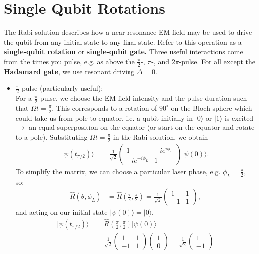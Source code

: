 \documentclass[lasers.tex]{subfiles}
\begin{document}
\section{Single Qubit Rotations}
The Rabi solution describes how a near-resonance EM field may be used to drive the qubit from any initial state to any final state. 
Refer to this operation as a \textbf{single-qubit rotation} or \textbf{single-qubit gate.}
Three useful interactions come from the times you pulse, e.g. as above the $\frac{\pi}{2}$-, $\pi$-, and $2\pi$-pulse.
For all except the \textbf{Hadamard gate}, we use resonant driving $\Delta=0$.
\begin{itemize}
    \item $\frac{\pi}{2}$-pulse (particularly useful):\\
        For a $\frac{\pi}{2}$ pulse, we choose the EM field intensity and the pulse duration such that $\Omega t=\frac{\pi}{2}$. 
        This corresponds to a rotation of $90^\circ$ on the Bloch sphere which could take us from pole to equator, i.e. a qubit initially in $|0\rangle$ or $|1\rangle$ is excited $\to$ an equal superposition on the equator (or start on the equator and rotate to a pole).
        Substituting $\Omega t=\frac{\pi}{2}$ in the Rabi solution, we obtain
        \begin{align}
            |\psi(t_{\pi/2})\rangle &= \frac{1}{\sqrt{2}} \begin{pmatrix} 1 & -ie^{i\phi_L} \\ -ie^{-i\phi_L} & 1\end{pmatrix}|\psi(0)\rangle.
        \end{align}
        To simplify the matrix, we can choose a particular laser phase, e.g. $\phi_L=\frac{\pi}{2}$, so:
        \begin{align}
            \hat{R}(\theta,\phi_L) &= \hat{R}\left(\frac{\pi}{2},\frac{\pi}{2}\right) = \frac{1}{\sqrt{2}}\begin{pmatrix}1 & 1 \\ -1 & 1\end{pmatrix},
        \end{align}
        and acting on our initial state $|\psi(0)\rangle=|0\rangle$,
        \begin{align}
            |\psi(t_{\pi/2})\rangle &= \hat{R}\left(\frac{\pi}{2},\frac{\pi}{2}\right)|\psi(0)\rangle \\
                                    &= \frac{1}{\sqrt{2}}\begin{pmatrix}1&1\\-1&1\end{pmatrix}\begin{pmatrix}1\\0\end{pmatrix} = \frac{1}{\sqrt{2}}\begin{pmatrix}1\\-1\end{pmatrix} \\

\end{align}
\end{itemize}
\end{document}
